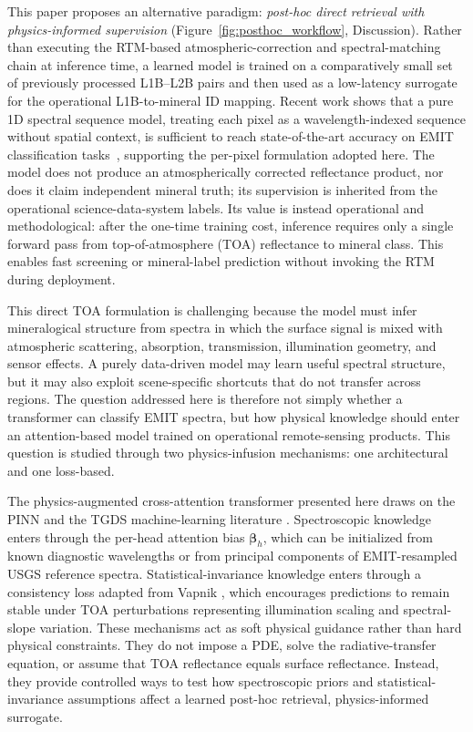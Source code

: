 \documentclass[11pt]{article}
\begin{document}
This paper proposes an alternative paradigm: \emph{post-hoc direct retrieval with physics-informed supervision} (Figure~\ref{fig:posthoc_workflow}, Discussion).
Rather than executing the RTM-based atmospheric-correction and spectral-matching chain at inference time, a learned model is trained on a comparatively small set of previously processed L1B--L2B pairs and then used as a low-latency surrogate for the operational L1B-to-mineral ID mapping.
Recent work shows that a pure 1D spectral sequence model, treating each pixel as a wavelength-indexed sequence without spatial context, is sufficient to reach state-of-the-art accuracy on EMIT classification tasks~\cite{lee2025spectf}, supporting the per-pixel formulation adopted here.
The model does not produce an atmospherically corrected reflectance product, nor does it claim independent mineral truth;
its supervision is inherited from the operational science-data-system labels.
Its value is instead operational and methodological: after the one-time training cost, inference requires only a single forward pass from top-of-atmosphere (TOA) reflectance to mineral class.
This enables fast screening or mineral-label prediction without invoking the RTM during deployment.

This direct TOA formulation is challenging because the model must infer mineralogical structure from spectra in which the surface signal is mixed with atmospheric scattering, absorption, transmission, illumination geometry, and sensor effects.
A purely data-driven model may learn useful spectral structure, but it may also exploit scene-specific shortcuts that do not transfer across regions.
The question addressed here is therefore not simply whether a transformer can classify EMIT spectra, but how physical knowledge should enter an attention-based model trained on operational remote-sensing products.
This question is studied through two physics-infusion mechanisms: one architectural and one loss-based.

The physics-augmented cross-attention transformer presented here draws on the PINN and the TGDS machine-learning literature \cite{karpatne2017tgds, raissi2019pinn}.
Spectroscopic knowledge enters through the per-head attention bias $\bm{\beta}_h$, which can be initialized from known diagnostic wavelengths or from principal components of EMIT-resampled USGS reference spectra.
Statistical-invariance knowledge enters through a consistency loss adapted from Vapnik \cite{vapnik2020}, which encourages predictions to remain stable under TOA perturbations representing illumination scaling and spectral-slope variation.
These mechanisms act as soft physical guidance rather than hard physical constraints.
They do not impose a PDE, solve the radiative-transfer equation, or assume that TOA reflectance equals surface reflectance.
Instead, they provide controlled ways to test how spectroscopic priors and statistical-invariance assumptions affect a learned post-hoc retrieval, physics-informed surrogate.
\end{document}
